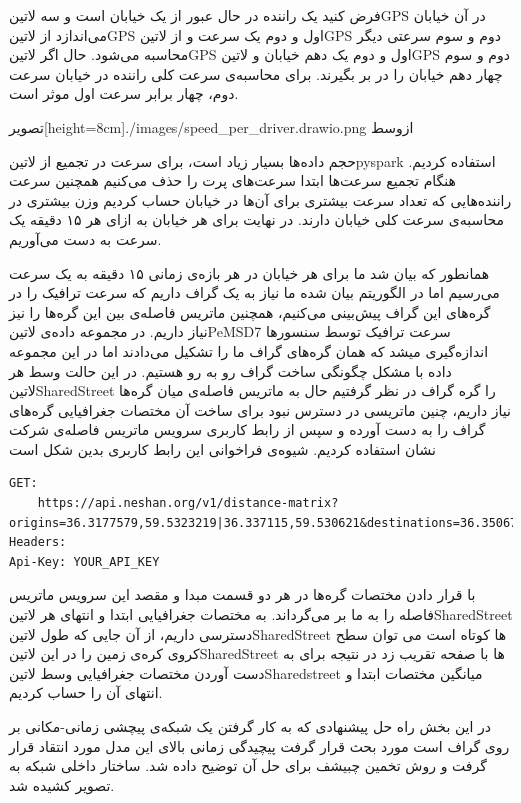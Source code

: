 فرض کنید یک راننده در حال عبور از یک خیابان است و سه ‌لاتین{‌GPS} در آن خیابان می‌اندازد از  لاتین{GPS} اول و دوم یک سرعت و از  لاتین{‌GPS} دوم و سوم سرعتی دیگر محاسبه می‌شود. حال اگر  لاتین{GPS} اول و دوم یک دهم خیابان و  لاتین{GPS} دوم و سوم چهار دهم خیابان را در بر بگیرند. برای محاسبه‌ی سرعت کلی راننده در خیابان سرعت دوم، چهار برابر سرعت اول موثر است.

  ‌تصویر[height=8cm]{./images/speed_per_driver.drawio.png}
  ‌ازوسط

حجم داده‌ها بسیار زیاد است، برای سرعت در تجمیع از ‌لاتین{pyspark} استفاده کردیم. هنگام تجمیع سرعت‌ها ابتدا سرعت‌های پرت را حذف می‌کنیم همچنین سرعت راننده‌هایی که تعداد سرعت بیشتری برای آن‌ها در خیابان حساب کردیم وزن بیشتری در محاسبه‌ی سرعت کلی خیابان دارند. در نهایت برای هر خیابان به ازای هر ۱۵ دقیقه یک سرعت به دست می‌آوریم.

همانطور که بیان شد ما برای هر خیابان در هر بازه‌ی زمانی ۱۵ دقیقه به یک سرعت می‌رسیم اما در الگوریتم بیان شده ما نیاز به یک گراف داریم که سرعت ترافیک را در گره‌های این گراف پیش‌بینی می‌کنیم، همچنین ماتریس فاصله‌ی بین این گره‌ها را نیز نیاز داریم. در مجموعه داده‌ی ‌لاتین{PeMSD7} سرعت ترافیک توسط سنسورها اندازه‌گیری میشد که همان گره‌های گراف ما را تشکیل می‌دادند اما در این مجموعه داده با مشکل چگونگی ساخت گراف رو به رو هستیم. در این حالت وسط هر  لاتین{SharedStreet} را گره گراف در نظر گرفتیم حال به ماتریس فاصله‌ی میان گره‌ها نیاز داریم، چنین ماتریسی در دسترس نبود برای ساخت آن مختصات جغرافیایی گره‌های گراف را به دست آورده و سپس از رابط کاربری سرویس ماتریس فاصله‌ی شرکت نشان استفاده کردیم. شیوه‌ی فراخوانی این رابط کاربری بدین شکل است

\begin{lstlisting}
GET:
    https://api.neshan.org/v1/distance-matrix?origins=36.3177579,59.5323219|36.337115,59.530621&destinations=36.35067,59.5451965|36.337005,59.530021
Headers:
Api-Key: YOUR_API_KEY
\end{lstlisting}

با قرار دادن مختصات گره‌ها در هر دو قسمت مبدا و مقصد این سرویس ماتریس فاصله را به ما بر می‌گرداند. به مختصات جغرافیایی ابتدا و انتهای هر ‌لاتین{SharedStreet} دسترسی داریم، از آن جایی که طول  لاتین{SharedStreet} ها کوتاه است می توان سطح کروی کره‌ی زمین را در این  لاتین{SharedStreet} ها با صفحه تقریب زد در نتیجه برای به دست آوردن مختصات جغرافیایی وسط  لاتین{Sharedstreet} میانگین مختصات ابتدا و انتهای آن را حساب کردیم.

در این بخش راه حل پیشنهادی که به کار گرفتن یک شبکه‌ی پیچشی زمانی-مکانی بر روی گراف است مورد بحث قرار گرفت پیچیدگی زمانی بالای این مدل مورد انتقاد قرار گرفت و روش تخمین چبیشف برای حل آن توضیح داده شد. ساختار داخلی شبکه به تصویر کشیده شد.
